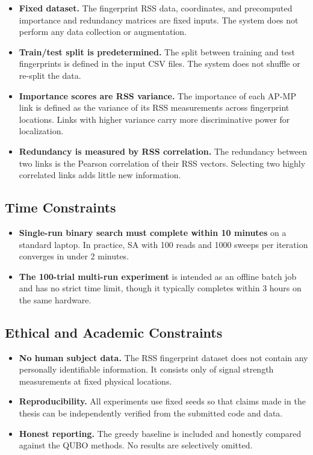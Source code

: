 \documentclass[12pt,a4paper]{article}
\begin{document}
\begin{itemize}[leftmargin=2em]
    \item \textbf{Fixed dataset.} The fingerprint RSS data, coordinates,
          and precomputed importance and redundancy matrices are fixed inputs.
          The system does not perform any data collection or augmentation.
    \item \textbf{Train/test split is predetermined.} The split between
          training and test fingerprints is defined in the input CSV files.
          The system does not shuffle or re-split the data.
    \item \textbf{Importance scores are RSS variance.} The importance of
          each AP-MP link is defined as the variance of its RSS measurements
          across fingerprint locations. Links with higher variance carry more
          discriminative power for localization.
    \item \textbf{Redundancy is measured by RSS correlation.} The redundancy
          between two links is the Pearson correlation of their RSS vectors.
          Selecting two highly correlated links adds little new information.
\end{itemize}

\subsection{Time Constraints}

\begin{itemize}[leftmargin=2em]
    \item \textbf{Single-run binary search must complete within 10 minutes}
          on a standard laptop. In practice, SA with 100 reads and 1000
          sweeps per iteration converges in under 2 minutes.
    \item \textbf{The 100-trial multi-run experiment} is intended as an
          offline batch job and has no strict time limit, though it typically
          completes within 3 hours on the same hardware.
\end{itemize}

\subsection{Ethical and Academic Constraints}

\begin{itemize}[leftmargin=2em]
    \item \textbf{No human subject data.} The RSS fingerprint dataset does
          not contain any personally identifiable information. It consists
          only of signal strength measurements at fixed physical locations.
    \item \textbf{Reproducibility.} All experiments use fixed seeds so that
          claims made in the thesis can be independently verified from the
          submitted code and data.
    \item \textbf{Honest reporting.} The greedy baseline is included and
          honestly compared against the QUBO methods. No results are
          selectively omitted.
\end{itemize}
\end{document}
